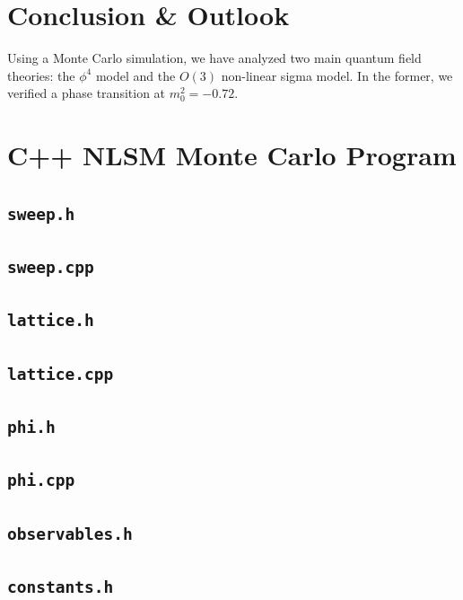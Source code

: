 \documentclass[12pt]{report}
\newcommand{\codeexample}[1]{
    \section{\texttt{#1}}
    
}
\begin{document}

\chapter{Conclusion \& Outlook}

Using a Monte Carlo simulation, we have analyzed two main quantum field theories: the $\phi^4$ model and the $O(3)$ non-linear sigma model. In the former, we verified a phase transition at $m_0^2=-0.72$. 


\appendix

\chapter{C++ NLSM Monte Carlo Program}

\codeexample{sweep.h}
\codeexample{sweep.cpp}
\codeexample{lattice.h}
\codeexample{lattice.cpp}
\codeexample{phi.h}
\codeexample{phi.cpp}
\codeexample{observables.h}
\codeexample{constants.h}



\end{document}
